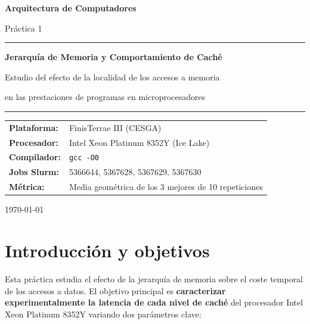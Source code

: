 \documentclass[12pt,a4paper]{article}
\begin{document}
\begin{titlepage}
  \centering
  \vspace*{2cm}
  {\LARGE\bfseries\color{azul} Arquitectura de Computadores\par}
  \vspace{0.4cm}
  {\large Práctica 1\par}
  \vspace{1.2cm}
  \rule{0.8\textwidth}{1pt}
  \vspace{0.5cm}

  {\LARGE\bfseries Jerarquía de Memoria y Comportamiento de Caché\par}
  \vspace{0.3cm}
  {\large Estudio del efecto de la localidad de los accesos a memoria\par
   en las prestaciones de programas en microprocesadores\par}

  \vspace{0.5cm}
  \rule{0.8\textwidth}{1pt}
  \vspace{2cm}

  \begin{tabular}{ll}
    \textbf{Plataforma:} & FinisTerrae III (CESGA) \\[4pt]
    \textbf{Procesador:} & Intel Xeon Platinum 8352Y (Ice Lake) \\[4pt]
    \textbf{Compilador:} & \texttt{gcc -O0} \\[4pt]
    \textbf{Jobs Slurm:}  & 5366644, 5367628, 5367629, 5367630 \\[4pt]
    \textbf{Métrica:}     & Media geométrica de los 3 mejores de 10 repeticiones \\
  \end{tabular}

  \vfill
  {\large\today\par}
\end{titlepage}

\tableofcontents
\clearpage

\section{Introducción y objetivos}

Esta práctica estudia el efecto de la jerarquía de memoria sobre el coste temporal de los accesos a datos. El objetivo principal es \textbf{caracterizar experimentalmente la latencia de cada nivel de caché} del procesador Intel Xeon Platinum 8352Y variando dos parámetros clave:
\end{document}
